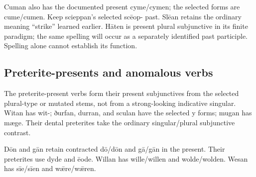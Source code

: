 \par\endgroup
Cuman also has the documented present cyme/\allowbreak{}cymen; the selected forms are cume/\allowbreak{}cumen. Keep scieppan’s selected scēop- past. Slēan retains the ordinary meaning “strike” learned earlier. Hāten is present plural subjunctive in its finite paradigm; the same spelling will occur as a separately identified past participle. Spelling alone cannot establish its function.

\subsection*{Preterite-presents and anomalous verbs}

The preterite-present verbs form their present subjunctives from the selected plural-type or mutated stems, not from a strong-looking indicative singular. Witan has wit-; ðurfan, durran, and sculan have the selected y forms; mugan has mæge. Their dental preterites take the ordinary singular/\allowbreak{}plural subjunctive contrast.

Dōn and gān retain contracted dō/\allowbreak{}dōn and gā/\allowbreak{}gān in the present. Their preterites use dyde and ēode. Willan has wille/\allowbreak{}willen and wolde/\allowbreak{}wolden. Wesan has sīe/\allowbreak{}sīen and wǣre/\allowbreak{}wǣren.

